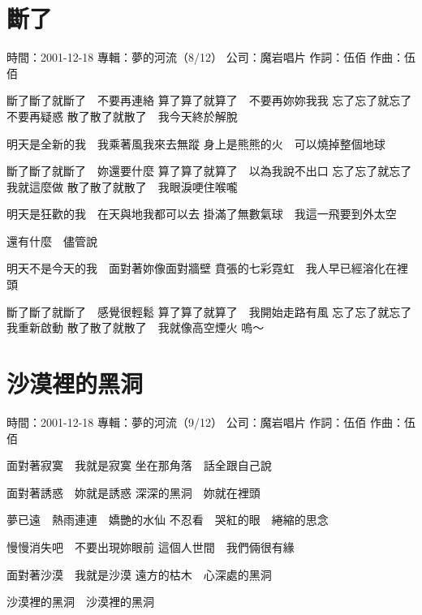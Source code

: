 \documentclass[UTF8,a4paper,oneside,twocolumn,12pt]{ctexbook}
\newcommand{\infopair}[2]{\textbullet #1：#2}
\newcommand{\zc}[1][伍佰]{\infopair{作詞}{#1}}
\newcommand{\zq}[1][伍佰]{\infopair{作曲}{#1}}
\newcommand{\zj}[1]{\infopair{專輯}{#1}}
\newcommand{\sj}[1]{\infopair{時間}{#1}}
\newcommand{\gs}[1]{\infopair{公司}{#1}}
\newenvironment{info}{\begin{flushleft}\kaishu
	}
	{\end{flushleft}\normalsize\yahei\par}
\newenvironment{lyric}{
	}
{}
\begin{document}
\section{斷了}
\begin{info}
	\sj{2001-12-18}
	\zj{夢的河流（8/12）}
	\gs{魔岩唱片}
	\zc
	\zq
\end{info}
\begin{lyric}
	斷了斷了就斷了　不要再連絡
	算了算了就算了　不要再妳妳我我
	忘了忘了就忘了　不要再疑惑
	散了散了就散了　我今天終於解脫

	明天是全新的我　我乘著風我來去無蹤
	身上是熊熊的火　可以燒掉整個地球

	斷了斷了就斷了　妳還要什麼
	算了算了就算了　以為我說不出口
	忘了忘了就忘了　我就這麼做
	散了散了就散了　我眼淚哽住喉嚨

	明天是狂歡的我　在天與地我都可以去
	掛滿了無數氣球　我這一飛要到外太空

	還有什麼　儘管說

	明天不是今天的我　面對著妳像面對牆壁
	賁張的七彩霓虹　我人早已經溶化在裡頭

	斷了斷了就斷了　感覺很輕鬆
	算了算了就算了　我開始走路有風
	忘了忘了就忘了　我重新啟動
	散了散了就散了　我就像高空煙火
	嗚～
\end{lyric}

\section{沙漠裡的黑洞}
\begin{info}
	\sj{2001-12-18}
	\zj{夢的河流（9/12）}
	\gs{魔岩唱片}
	\zc
	\zq
\end{info}
\begin{lyric}
	面對著寂寞　我就是寂寞
	坐在那角落　話全跟自己說

	面對著誘惑　妳就是誘惑
	深深的黑洞　妳就在裡頭

	夢已遠　熱雨連連　嬌艷的水仙
	不忍看　哭紅的眼　綣縮的思念

	慢慢消失吧　不要出現妳眼前
	這個人世間　我們倆很有緣

	面對著沙漠　我就是沙漠
	遠方的枯木　心深處的黑洞

	沙漠裡的黑洞　沙漠裡的黑洞
\end{lyric}
\end{document}
